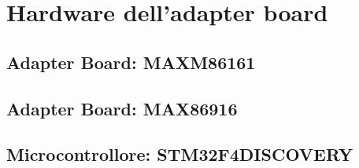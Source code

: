 \section{Hardware dell'adapter board}
\begin{comment}
L'hardware utilizzato per condurre lo studio oggetto di questa tesi, consiste in due piattaforme indossabili dalle dimensioni ridotte. Ciascuna piattaforma si compone di una Adapter Board, che consiste nella scheda che monta il modulo PPG, e un microcontrollore utilizzato per l'acquisizione ed elaborazione dei segnali, in particolare è stato utilizzato STM32F4DISCOVERY, prodotto da STMicroelectronics, in entrambi i casi.
La due piattaforme si differenziano per l'Adapter Board progettata, in particolare, per il modulo PPG utilizzato che, in un caso, è il MAXM86161, e nell'altro, è il MAX86916, entrambi prodotti da Maxim Integrated.
\end{comment}

\subsection{Adapter Board: MAXM86161}
\begin{comment}
	L'Adapter Board è la scheda che monta il sensore PPG utilizzata per fare le acquisizioni che, vengono acquisite con il microcontrollore STM32F4DISCOVERY. I due sottosistemi utilizzano il protocollo I2C per comunicare.
\end{comment}

\subsection{Adapter Board: MAX86916}
\subsection{Microcontrollore: STM32F4DISCOVERY}